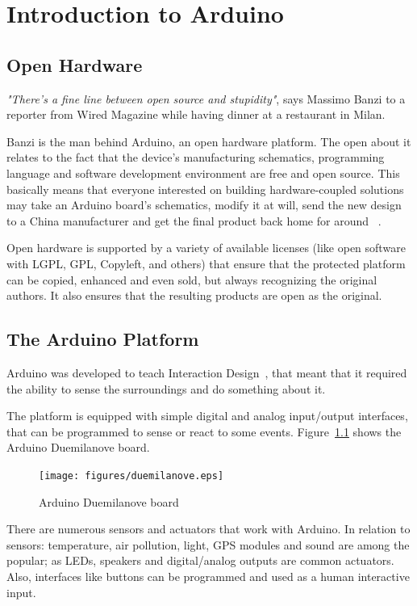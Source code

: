 \chapter{Introduction to Arduino}

\section{Open Hardware}
\emph{"There's a fine line between open source and stupidity"}, says Massimo Banzi to a reporter from Wired Magazine while having dinner at a restaurant in Milan. 

Banzi is the man behind Arduino, an open hardware platform. The open about it relates to the fact that the device's manufacturing schematics, programming language and software development environment are free and open source. This basically means that everyone interested on building hardware-coupled solutions may take an Arduino board's schematics, modify it at will, send the new design to a China manufacturer and get the final product back home for around ~\cite{wiredOpenHardware}.

Open hardware is supported by a variety of available licenses (like open software with LGPL, GPL, Copyleft, and others) that ensure that the protected platform can be copied, enhanced and even sold, but always recognizing the original authors. It also ensures that the resulting products are open as the original.

\section{The Arduino Platform}
Arduino was developed to teach Interaction Design~\cite{banzi2008getting}, that meant that it required the ability to sense the surroundings and do something about it.

The platform is equipped with simple digital and analog input/output interfaces, that can be programmed to sense or react to some events. Figure~\ref{fig:ArduinoBoard} shows the Arduino Duemilanove board.

\begin{figure}[htbp]
  \centering
  \texttt{[image: figures/duemilanove.eps]}
  \caption{Arduino Duemilanove board
  \label{fig:ArduinoBoard}}
\end{figure}

There are numerous sensors and actuators that work with Arduino. In relation to sensors: temperature, air pollution, light, GPS modules and sound are among the popular; as LEDs, speakers and digital/analog outputs are common actuators. Also, interfaces like buttons can be programmed and used as a human interactive input.

